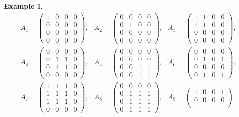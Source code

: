 \documentclass[11pt,a4paper,reqno]{article}
\numberwithin{equation}{section}
\theoremstyle{definition}
\newtheorem{example}[theorem]{Example}
\begin{document}
\begin{example}
\begin{equation*}
\begin{array}{ccc}
A_1=\begin{pmatrix}
1 & 0 & 0 & 0\\
0 & 0 & 0 & 0\\
0 & 0 & 0 & 0\\
0 & 0 & 0 & 0
\end{pmatrix},&
A_2=\begin{pmatrix}
0 & 0 & 0 & 0\\
0 & 1 & 0 & 0\\
0 & 0 & 0 & 0\\
0 & 0 & 0 & 0
\end{pmatrix},&
A_3=\begin{pmatrix}
1 & 1 & 0 & 0\\
1 & 1 & 0 & 0\\
0 & 0 & 0 & 0\\
0 & 0 & 0 & 0
\end{pmatrix},\\[6ex]
A_4=\begin{pmatrix}
0 & 0 & 0 & 0\\
0 & 1 & 1 & 0\\
0 & 1 & 1 & 0\\
0 & 0 & 0 & 0
\end{pmatrix},&
A_5=\begin{pmatrix}
0 & 0 & 0 & 0\\
0 & 0 & 0 & 0\\
0 & 0 & 1 & 1\\
0 & 0 & 1 & 1
\end{pmatrix},&
A_6=\begin{pmatrix}
0 & 0 & 0 & 0\\
0 & 1 & 0 & 1\\
0 & 0 & 0 & 0\\
0 & 1 & 0 & 1
\end{pmatrix},\\[6ex]
A_7=\begin{pmatrix}
1 & 1 & 1 & 0\\
1 & 1 & 1 & 0\\
1 & 1 & 1 & 0\\
0 & 0 & 0 & 0
\end{pmatrix},&
A_8=\begin{pmatrix}
0 & 0 & 0 & 0\\
0 & 1 & 1 & 1\\
0 & 1 & 1 & 1\\
0 & 1 & 1 & 1
\end{pmatrix},&
A_9=\begin{pmatrix}
1 & 0 & 0 & 1\\
0 & 0 & 0 & 0\\

\end{pmatrix}
\end{array}
\end{equation*}
\end{example}
\end{document}
